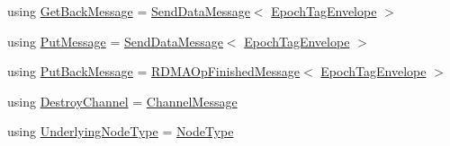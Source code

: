 \begin{DoxyCompactItemize}
\item 
using \hyperlink{namespacevt_1_1rdma_a72a94b92eba75ec9fec43b2a9a4ad878}{Get\+Back\+Message} = \hyperlink{structvt_1_1rdma_1_1_send_data_message}{Send\+Data\+Message}$<$ \hyperlink{namespacevt_af23b58014ced6898422213a0e5e6a27a}{Epoch\+Tag\+Envelope} $>$
\item 
using \hyperlink{namespacevt_1_1rdma_ae0a0330c647ec5ac5d508750f4cd4a06}{Put\+Message} = \hyperlink{structvt_1_1rdma_1_1_send_data_message}{Send\+Data\+Message}$<$ \hyperlink{namespacevt_af23b58014ced6898422213a0e5e6a27a}{Epoch\+Tag\+Envelope} $>$
\item 
using \hyperlink{namespacevt_1_1rdma_a07a52401fe8185d190371b3333dc61ac}{Put\+Back\+Message} = \hyperlink{structvt_1_1rdma_1_1_r_d_m_a_op_finished_message}{R\+D\+M\+A\+Op\+Finished\+Message}$<$ \hyperlink{namespacevt_af23b58014ced6898422213a0e5e6a27a}{Epoch\+Tag\+Envelope} $>$
\item 
using \hyperlink{namespacevt_1_1rdma_a1273aeddd73c1ffac0d7383ef7a314d8}{Destroy\+Channel} = \hyperlink{structvt_1_1rdma_1_1_channel_message}{Channel\+Message}
\item 
using \hyperlink{namespacevt_1_1rdma_a20d01bc82b95453c162d4b9857a4a78a}{Underlying\+Node\+Type} = \hyperlink{namespacevt_a866da9d0efc19c0a1ce79e9e492f47e2}{Node\+Type}
\end{DoxyCompactItemize}
